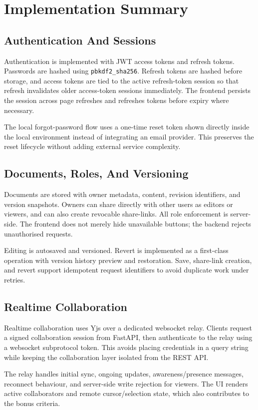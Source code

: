 \chapter{Implementation Summary}

\section{Authentication And Sessions}

Authentication is implemented with JWT access tokens and refresh tokens. Passwords are hashed using
\texttt{pbkdf2\_sha256}. Refresh tokens are hashed before storage, and access tokens are tied to the
active refresh-token session so that refresh invalidates older access-token sessions immediately. The
frontend persists the session across page refreshes and refreshes tokens before expiry where necessary.

The local forgot-password flow uses a one-time reset token shown directly inside the local environment
instead of integrating an email provider. This preserves the reset lifecycle without adding external
service complexity.

\section{Documents, Roles, And Versioning}

Documents are stored with owner metadata, content, revision identifiers, and version snapshots. Owners can
share directly with other users as editors or viewers, and can also create revocable share-links. All role
enforcement is server-side. The frontend does not merely hide unavailable buttons; the backend rejects
unauthorised requests.

Editing is autosaved and versioned. Revert is implemented as a first-class operation with version history
preview and restoration. Save, share-link creation, and revert support idempotent request identifiers to
avoid duplicate work under retries.

\section{Realtime Collaboration}

Realtime collaboration uses Yjs over a dedicated websocket relay. Clients request a signed collaboration
session from FastAPI, then authenticate to the relay using a websocket subprotocol token. This avoids
placing credentials in a query string while keeping the collaboration layer isolated from the REST API.

The relay handles initial sync, ongoing updates, awareness/presence messages, reconnect behaviour, and
server-side write rejection for viewers. The UI renders active collaborators and remote cursor/selection
state, which also contributes to the bonus criteria.
